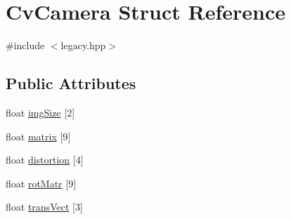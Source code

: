 \hypertarget{structCvCamera}{\section{Cv\-Camera Struct Reference}
\label{structCvCamera}
}


{\ttfamily \#include $<$legacy.\-hpp$>$}

\subsection*{Public Attributes}
\begin{DoxyCompactItemize}
\item 
float \hyperlink{structCvCamera_a9c640598804a3a64825e73b9456725a6}{img\-Size} \mbox{[}2\mbox{]}
\item 
float \hyperlink{structCvCamera_a59f4e88cb77d0659b7721fdb221857e2}{matrix} \mbox{[}9\mbox{]}
\item 
float \hyperlink{structCvCamera_a042d0f5498714b8ccbc42edb6dc6d3f4}{distortion} \mbox{[}4\mbox{]}
\item 
float \hyperlink{structCvCamera_a2948313899fc0f26610cc228039240ec}{rot\-Matr} \mbox{[}9\mbox{]}
\item 
float \hyperlink{structCvCamera_ab4671992d1b78e26994418f1845727b4}{trans\-Vect} \mbox{[}3\mbox{]}
\end{DoxyCompactItemize}



